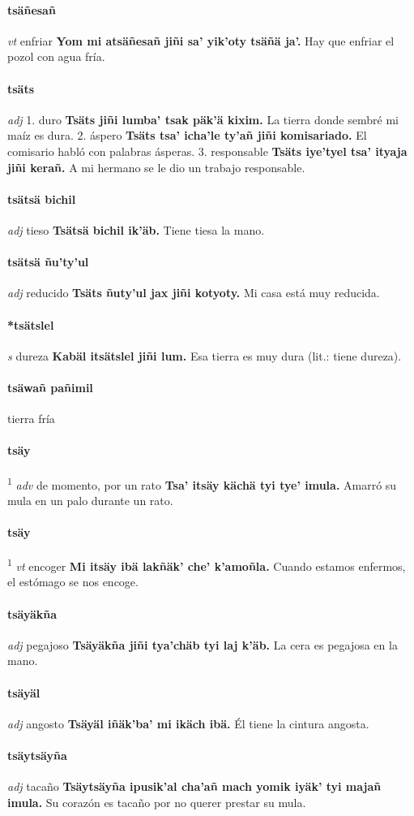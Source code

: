 \documentclass{scrbook}
\newcommand{\entry}[1]{\paragraph{#1}}
\newcommand{\onedefinition}[1]{#1.}
\newcommand{\defsuperscript}[1]{\textsuperscript{1}}
\newcommand{\partofspeech}[1]{\textit{#1}}
\newcommand{\spanishtranslation}[1]{#1}
\newcommand{\cholexample}[1]{\textbf{#1}}
\newcommand{\exampletranslation}[1]{#1}
\begin{document}
\begin{multicols}{2}
\entry{tsäñesañ}
\partofspeech{vt}
\spanishtranslation{enfriar}
\cholexample{Yom mi atsäñesañ jiñi sa' yik'oty tsäñä ja'.}
\exampletranslation{Hay que enfriar el pozol con agua fría.}

\entry{tsäts}
\partofspeech{adj}
\onedefinition{1}
\spanishtranslation{duro}
\cholexample{Tsäts jiñi lumba' tsak päk'ä kixim.}
\exampletranslation{La tierra donde sembré mi maíz es dura.}
\onedefinition{2}
\spanishtranslation{áspero}
\cholexample{Tsäts tsa' icha'le ty'añ jiñi komisariado.}
\exampletranslation{El comisario habló con palabras ásperas.}
\onedefinition{3}
\spanishtranslation{responsable}
\cholexample{Tsäts iye'tyel tsa' ityaja jiñi kerañ.}
\exampletranslation{A mi hermano se le dio un trabajo responsable.}

\entry{tsätsä bichil}
\partofspeech{adj}
\spanishtranslation{tieso}
\cholexample{Tsätsä bichil ik'äb.}
\exampletranslation{Tiene tiesa la mano.}

\entry{tsätsä ñu'ty'ul}
\partofspeech{adj}
\spanishtranslation{reducido}
\cholexample{Tsäts ñuty'ul jax jiñi kotyoty.}
\exampletranslation{Mi casa está muy reducida.}

\entry{*tsätslel}
\partofspeech{s}
\spanishtranslation{dureza}
\cholexample{Kabäl itsätslel jiñi lum.}
\exampletranslation{Esa tierra es muy dura (lit.: tiene dureza).}

\entry{tsäwañ pañimil}
\spanishtranslation{tierra fría}

\entry{tsäy}
\defsuperscript{1}
\partofspeech{adv}
\spanishtranslation{de momento, por un rato}
\cholexample{Tsa' itsäy kächä tyi tye' imula.}
\exampletranslation{Amarró su mula en un palo durante un rato.}

\entry{tsäy}
\defsuperscript{2}
\partofspeech{vt}
\spanishtranslation{encoger}
\cholexample{Mi itsäy ibä lakñäk' che' k'amoñla.}
\exampletranslation{Cuando estamos enfermos, el estómago se nos encoge.}

\entry{tsäyäkña}
\partofspeech{adj}
\spanishtranslation{pegajoso}
\cholexample{Tsäyäkña jiñi tya'chäb tyi laj k'äb.}
\exampletranslation{La cera es pegajosa en la mano.}

\entry{tsäyäl}
\partofspeech{adj}
\spanishtranslation{angosto}
\cholexample{Tsäyäl iñäk'ba' mi ikäch ibä.}
\exampletranslation{Él tiene la cintura angosta.}

\entry{tsäytsäyña}
\partofspeech{adj}
\spanishtranslation{tacaño}
\cholexample{Tsäytsäyña ipusik'al cha'añ mach yomik iyäk' tyi majañ imula.}
\exampletranslation{Su corazón es tacaño por no querer prestar su mula.}


\end{multicols}
\end{document}

